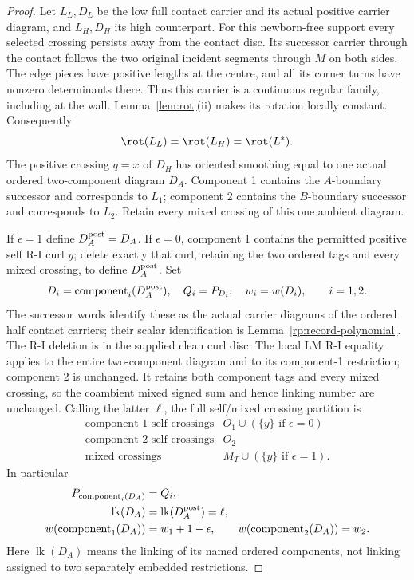 \begin{proof}
Let $L_L,D_L$ be the low full contact carrier and its actual positive carrier
diagram, and $L_H,D_H$ its high counterpart.  For this newborn-free support every selected crossing persists away
from the contact disc. Its successor carrier through the contact follows
the two original incident segments through $M$ on both sides. The edge
pieces have positive lengths at the centre, and all its corner turns
have nonzero determinants there. Thus this carrier is a continuous
regular family, including at the wall. Lemma~\ref{lem:rot}(ii) makes
its rotation locally constant. Consequently
\begin{equation}\label{s7c:full-rotation}
 \rot(L_L)=\rot(L_H)=\rot(L^*).
\end{equation}
The positive crossing $q=x$ of $D_H$ has oriented smoothing equal to
one actual ordered two-component diagram $D_A$.  Component 1 contains
the $A$-boundary successor and corresponds to $L_1$; component 2
contains the $B$-boundary successor and corresponds to $L_2$.
Retain every mixed crossing of this one ambient diagram.

If $\epsilon=1$ define $D_A^{\rm post}=D_A$.  If $\epsilon=0$,
component 1 contains the permitted positive self R-I curl $y$; delete
exactly that curl, retaining the two ordered tags and every mixed crossing,
to define $D_A^{\rm post}$.  Set
\begin{equation}\label{s7c:component-data}
 D_i=\operatorname{component}_i(D_A^{\rm post}),\quad
 Q_i=P_{D_i},\quad w_i=w(D_i),\qquad i=1,2.
\end{equation}
The successor words identify these as the actual carrier diagrams of
the ordered half contact carriers; their scalar identification is
Lemma~\ref{rp:record-polynomial}. The R-I deletion is in the supplied
clean curl disc. The local LM R-I equality applies to the entire
two-component diagram and to its component-1 restriction; component 2
is unchanged. It retains both component tags and every mixed crossing,
so the coambient mixed signed sum and hence linking number are unchanged.  Calling the latter $\ell$,
the full self/mixed crossing partition is
\begin{equation}\label{s7c:crossing-partition}
 \begin{array}{c|l}
 \text{component 1 self crossings}&O_1\cup(\{y\}\text{ if }\epsilon=0)\\
 \text{component 2 self crossings}&O_2\\
 \text{mixed crossings}&M_T\cup(\{y\}\text{ if }\epsilon=1).
 \end{array}
\end{equation}
In particular
\begin{align}
 P_{\operatorname{component}_i(D_A)}&=Q_i,\label{s7c:component-polynomial}\\
 \operatorname{lk}(D_A)&=\operatorname{lk}(D_A^{\rm post})=\ell,
 \label{s7c:ambient-linking}\\
 w(\operatorname{component}_1(D_A))&=w_1+1-\epsilon,
 \qquad w(\operatorname{component}_2(D_A))=w_2.
 \label{s7c:pre-curl-writhe}
\end{align}
Here $\operatorname{lk}(D_A)$ means the linking of its named ordered
components, not linking assigned to two separately embedded restrictions.


\end{proof}
